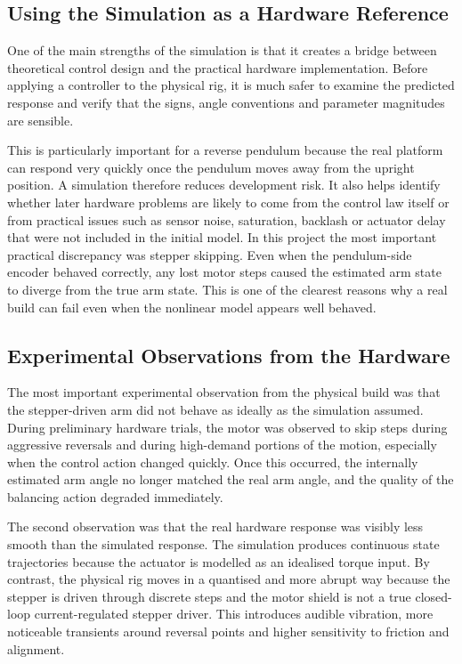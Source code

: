 \documentclass[conference]{IEEEtran}
\begin{document}
\subsection{Using the Simulation as a Hardware Reference}
One of the main strengths of the simulation is that it creates a bridge between theoretical control design and the practical hardware implementation. Before applying a controller to the physical rig, it is much safer to examine the predicted response and verify that the signs, angle conventions and parameter magnitudes are sensible.

This is particularly important for a reverse pendulum because the real platform can respond very quickly once the pendulum moves away from the upright position. A simulation therefore reduces development risk. It also helps identify whether later hardware problems are likely to come from the control law itself or from practical issues such as sensor noise, saturation, backlash or actuator delay that were not included in the initial model. In this project the most important practical discrepancy was stepper skipping. Even when the pendulum-side encoder behaved correctly, any lost motor steps caused the estimated arm state to diverge from the true arm state. This is one of the clearest reasons why a real build can fail even when the nonlinear model appears well behaved.

\subsection{Experimental Observations from the Hardware}
The most important experimental observation from the physical build was that the stepper-driven arm did not behave as ideally as the simulation assumed. During preliminary hardware trials, the motor was observed to skip steps during aggressive reversals and during high-demand portions of the motion, especially when the control action changed quickly. Once this occurred, the internally estimated arm angle no longer matched the real arm angle, and the quality of the balancing action degraded immediately.

The second observation was that the real hardware response was visibly less smooth than the simulated response. The simulation produces continuous state trajectories because the actuator is modelled as an idealised torque input. By contrast, the physical rig moves in a quantised and more abrupt way because the stepper is driven through discrete steps and the motor shield is not a true closed-loop current-regulated stepper driver. This introduces audible vibration, more noticeable transients around reversal points and higher sensitivity to friction and alignment.
\end{document}
